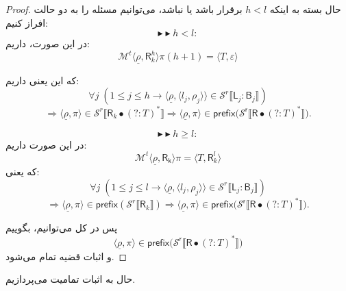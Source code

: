 \begin{proof}
حال بسته به اینکه $h<l$ برقرار باشد یا نباشد، می‌توانیم مسئله را به دو حالت افراز کنیم:
$$\blacktriangleright\blacktriangleright h<l:$$
در این صورت، داریم:
$$\mathcal{M}^t \langle \underline{\rho}, \mathsf{R}_k^h \rangle \pi(h+1)=\langle \mathit{T} , \varepsilon \rangle$$

که این یعنی داریم:
$$\forall j\;(1\leq j \leq h \rightarrow \langle \underline{\rho},\langle l_j, \rho_j \rangle\rangle \in \mathcal{S}^r \llbracket \mathsf{L}_j : \mathsf{B}_j \rrbracket)$$
$$\Rightarrow \langle \underline{\rho}, \pi \rangle \in \mathcal{S}^r \llbracket \mathsf{R}_k \bullet (?:\mathit{T})^* \rrbracket \Rightarrow \langle \underline{\rho},\pi\rangle \in \mathsf{prefix(\mathcal{S}^r \llbracket R \bullet (?:\mathit{T})^*} \rrbracket).$$ 

$$\blacktriangleright\blacktriangleright h\geq l:$$
در این صورت داریم:
$$\mathcal{M}^t \langle\underline{\rho},\mathsf{R_k}\rangle \pi = \langle \mathit{T}, \mathsf{R}_k^l\rangle$$
که یعنی:
$$\forall j\;(1\leq j \leq l \rightarrow \langle \underline{\rho},\langle l_j, \rho_j \rangle\rangle \in \mathcal{S}^r \llbracket \mathsf{L}_j : \mathsf{B}_j \rrbracket)$$
$$\Rightarrow \langle \underline{\rho}, \pi \rangle \in \mathsf{prefix}(\mathcal{S}^r \llbracket \mathsf{R}_k\rrbracket) \Rightarrow \langle \underline{\rho},\pi\rangle \in \mathsf{prefix(\mathcal{S}^r \llbracket R \bullet (?:\mathit{T})^*} \rrbracket).$$ 

پس در کل می‌توانیم، بگوییم
$$\langle \underline{\rho},\pi\rangle \in \mathsf{prefix(\mathcal{S}^r \llbracket R \bullet (?:\mathit{T})^*} \rrbracket)$$
و اثبات قضیه تمام می‌شود.
\end{proof}

حال به اثبات تمامیت می‌پردازیم.

